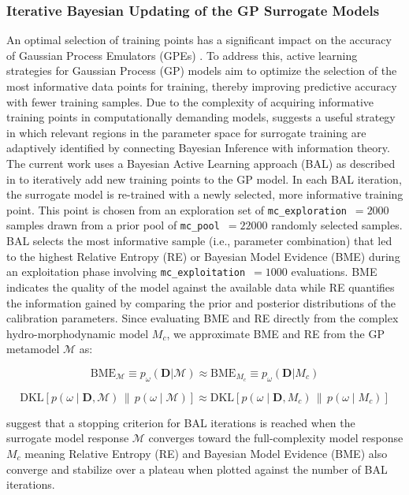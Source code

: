 \documentclass[draft,linenumbers,onecolumn]{agujournal2019} %
\begin{document}
\subsubsection{Iterative Bayesian Updating of the GP Surrogate Models}
\label{subsec:sec2.6.3}
An optimal selection of training points has a significant impact on the accuracy of Gaussian Process Emulators (GPEs) \cite{sinsbeck2017sequential}. To address this, active learning strategies for Gaussian Process (GP) models aim to optimize the selection of the most informative data points for training, thereby improving predictive accuracy with fewer training samples. Due to the complexity of acquiring informative training points in computationally demanding models,  suggests a useful strategy in which relevant regions in the parameter space for surrogate training are adaptively identified by connecting Bayesian Inference with information theory. The current work uses a Bayesian Active Learning approach (BAL) as described in  to iteratively add new training points to the GP model. In each BAL iteration, the surrogate model is re-trained with a newly selected, more informative training point. This point is chosen from an exploration set of \texttt{mc\_exploration}~$= 2000$ samples drawn from a prior pool of \texttt{mc\_pool}~$= 22000$ randomly selected samples. BAL selects the most informative sample (i.e., parameter combination) that led to the highest Relative Entropy (RE) or Bayesian Model Evidence (BME) during an exploitation phase involving \texttt{mc\_exploitation}~$= 1000$ evaluations. BME indicates the quality of the model against the available data while RE quantifies the information gained by comparing the prior and posterior distributions of the calibration parameters. Since evaluating BME and RE directly from the complex hydro-morphodynamic model \( M_c \), we approximate BME and RE from the GP metamodel \( \mathcal{M} \) as:

\[
\text{BME}_{\mathcal{M}} \equiv p_{\omega}(\mathbf{D}|\mathcal{M}) \approx \text{BME}_{M_c} \equiv p_{\omega}(\mathbf{D}|M_c)
\]

\[
\text{DKL}\left[ p(\omega \mid \mathbf{D}, \mathcal{M}) \,\|\, p(\omega \mid \mathcal{M}) \right] \approx \text{DKL}\left[ p(\omega \mid \mathbf{D}, M_c) \,\|\, p(\omega \mid M_c) \right]
\]

 suggest that a stopping criterion for BAL iterations is reached when the surrogate model response $\mathcal{M}$ converges toward the full-complexity model response $M_c$ meaning Relative Entropy (RE) and Bayesian Model Evidence (BME) also converge and stabilize over a plateau when plotted against the number of BAL iterations.
\end{document}
